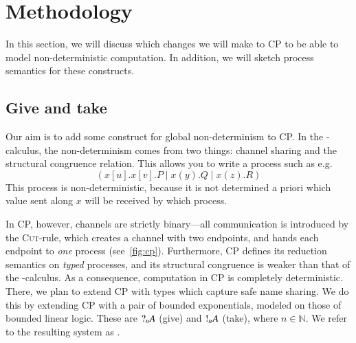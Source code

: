 \documentclass[twocolumn]{article}
\begin{document}
\section{Methodology}
In this section, we will discuss which changes we will make to CP to be able to
model non-deterministic computation. In addition, we will sketch process
semantics for these constructs.

\subsection{Give and take}\label{sec:give-and-take}
Our aim is to add some construct for global non-determinism to CP.
In the \textpi-calculus, the non-determinism comes from two things: channel
sharing and the structural congruence relation.
This allows you to write a process such as e.g.\ %
\[
  (x[u].x[v].P \mid x(y).Q \mid x(z).R)
\]
This process is non-deterministic, because it is not determined a priori which
value sent along $x$ will be received by which process. 

In CP, however, channels are strictly binary---all communication is introduced
by the \textsc{Cut}-rule, which creates a channel with two endpoints, and hands
each endpoint to \emph{one} process (see~\autoref{fig:cp}).
Furthermore, CP defines its reduction semantics on \emph{typed} processes, and
its structural congruence is weaker than that of the \textpi-calculus.
As a consequence, computation in CP is completely deterministic.
There, we plan to extend CP with types which capture safe name sharing.
We do this by extending CP with a pair of bounded exponentials, modeled on those
of bounded linear logic. These are $\give[n]{A}$ (give) and $\take[n]{A}$
(take), where $n \in \mathbb{N}$. 
We refer to the resulting system as \gtcp.
\end{document}
